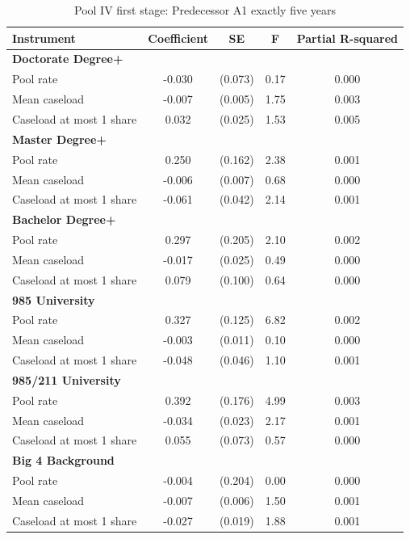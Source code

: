 \begin{table}[htbp]
\footnotesize
\def\sym#1{\ifmmode^{#1}\else\(^{#1}\)\fi}
\centering
\caption{Pool IV first stage: Predecessor A1 exactly five years}
\begin{threeparttable}
\begin{tabular}{p{}cccc}
\toprule
Instrument & Coefficient & SE & F & Partial R-squared \\
\midrule
\multicolumn{5}{l}{\textbf{Doctorate Degree+}} \\
Pool rate & -0.030 & (0.073) & 0.17 & 0.000 \\
Mean caseload & -0.007 & (0.005) & 1.75 & 0.003 \\
Caseload at most 1 share & 0.032 & (0.025) & 1.53 & 0.005 \\
\multicolumn{5}{l}{\textbf{Master Degree+}} \\
Pool rate & 0.250 & (0.162) & 2.38 & 0.001 \\
Mean caseload & -0.006 & (0.007) & 0.68 & 0.000 \\
Caseload at most 1 share & -0.061 & (0.042) & 2.14 & 0.001 \\
\multicolumn{5}{l}{\textbf{Bachelor Degree+}} \\
Pool rate & 0.297 & (0.205) & 2.10 & 0.002 \\
Mean caseload & -0.017 & (0.025) & 0.49 & 0.000 \\
Caseload at most 1 share & 0.079 & (0.100) & 0.64 & 0.000 \\
\multicolumn{5}{l}{\textbf{985 University}} \\
Pool rate & 0.327 & (0.125) & 6.82 & 0.002 \\
Mean caseload & -0.003 & (0.011) & 0.10 & 0.000 \\
Caseload at most 1 share & -0.048 & (0.046) & 1.10 & 0.001 \\
\multicolumn{5}{l}{\textbf{985/211 University}} \\
Pool rate & 0.392 & (0.176) & 4.99 & 0.003 \\
Mean caseload & -0.034 & (0.023) & 2.17 & 0.001 \\
Caseload at most 1 share & 0.055 & (0.073) & 0.57 & 0.000 \\
\multicolumn{5}{l}{\textbf{Big 4 Background}} \\
Pool rate & -0.004 & (0.204) & 0.00 & 0.000 \\
Mean caseload & -0.007 & (0.006) & 1.50 & 0.001 \\
Caseload at most 1 share & -0.027 & (0.019) & 1.88 & 0.001 \\

\end{tabular}
\end{threeparttable}
\end{table}
